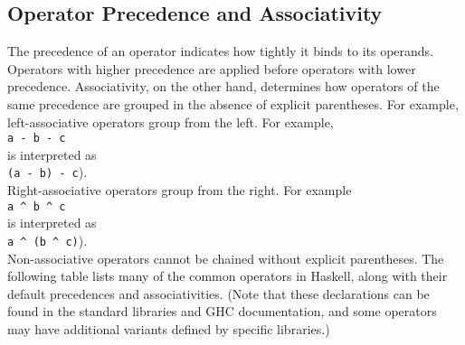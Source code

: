 \subsection*{Operator Precedence and Associativity}
The precedence of an operator indicates how tightly it binds to its operands. Operators with higher precedence
are applied before operators with lower precedence. Associativity, on the other hand, determines how operators
of the same precedence are grouped in the absence of explicit parentheses. For example, left-associative
operators group from the left.  For example,
\\[0.2cm]
\hspace*{1.3cm}
\texttt{a - b - c}
\\[0.2cm]
is interpreted as
\\[0.2cm]
\hspace*{1.3cm}
\texttt{(a - b) - c}). 
\\[0.2cm]
Right-associative operators group from the right.  For example
\\[0.2cm]
\hspace*{1.3cm}
\texttt{a \^{ } b \^{ } c}
\\[0.2cm]
is interpreted as
\\[0.2cm]
\hspace*{1.3cm}
\texttt{a \^{ } (b \^{ } c)}).
\\[0.2cm]
Non-associative operators cannot be chained without explicit parentheses. 
The following table lists many of the common operators in Haskell, along with their default precedences and
associativities. (Note that these declarations can be found in the standard libraries and GHC documentation,
and some operators may have additional variants defined by specific libraries.) 
\bigskip


